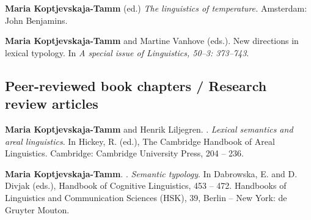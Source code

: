 \documentclass[a4paper]{article}
\begin{document}
		 
		 	  \textbf{Maria Koptjevskaja-Tamm} (ed.)
		 	  \newblock \textit{The linguistics of temperature. }
		 	\newblock	   Amsterdam: John Benjamins.
	
	  \textbf{Maria Koptjevskaja-Tamm} and Martine Vanhove (eds.).
	  \newblock New directions in
	   lexical typology. 
	   \newblock In \textit{A special issue of Linguistics,
	   50–3: 373–743}.


\subsection*{\textbf{ Peer-reviewed book chapters / Research review articles }}


	    \textbf{Maria Koptjevskaja-Tamm} and Henrik Liljegren.
	    .
	    \newblock \textit{Lexical semantics and areal linguistics}. \newblock In Hickey, R. (ed.),
	  The Cambridge Handbook of Areal Linguistics.
	  Cambridge: Cambridge University Press, 204 – 236.

	  \textbf{Maria Koptjevskaja-Tamm}.
	  .
	  \newblock \textit{Semantic typology}.
	   \newblock In Dabrowska, E. and D. Divjak (eds.),  Handbook of Cognitive Linguistics, 453 – 472.
	  Handbooks of Linguistics and Communication Sciences (HSK), 39, Berlin – New York: de Gruyter Mouton.
	

	
	\newpage

	
	
	
\end{document}
